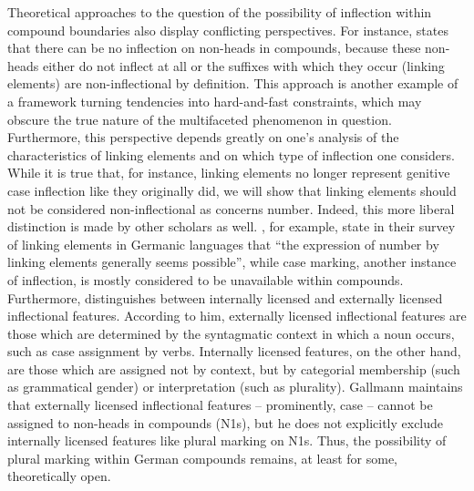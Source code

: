 Theoretical approaches to the question of the possibility of inflection within compound boundaries also display conflicting perspectives. 
For instance, \textcite[9]{Schluecker2012} states that there can be no inflection on non-heads in compounds, because these non-heads either do not inflect at all or the suffixes with which they occur (\ie linking elements) are non-inflectional by definition.
This approach is another example of a framework turning tendencies into hard-and-fast constraints, which may obscure the true nature of the multifaceted phenomenon in question.
Furthermore, this perspective depends greatly on one's analysis of the characteristics of linking elements and on which type of inflection one considers.
While it is true that, for instance, linking elements no longer represent genitive case inflection like they originally did, we will show that linking elements should not be considered non-inflectional as concerns number.
Indeed, this more liberal distinction is made by other scholars as well.
\textcite[577]{FuhrhopKuerschner2015}, for example, state in their survey of linking elements in Germanic languages that ``the expression of number by linking elements generally seems possible'', while case marking, another instance of inflection, is mostly considered to be unavailable within compounds.
Furthermore, \textcite[178--180]{Gallmann1998} distinguishes between internally licensed and externally licensed inflectional features.
According to him, externally licensed inflectional features are those which are determined by the syntagmatic context in which a noun occurs, such as case assignment by verbs.
Internally licensed features, on the other hand, are those which are assigned not by context, but by categorial membership (such as grammatical gender) or interpretation (such as plurality).%
Gallmann maintains that externally licensed inflectional features -- prominently, case -- cannot be assigned to non-heads in compounds (N1s), but he does not explicitly exclude internally licensed features like plural marking on N1s.
Thus, the possibility of plural marking within German compounds remains, at least for some, theoretically open.

